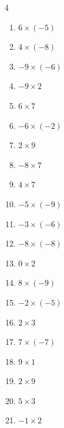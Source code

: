 \begin{multicols}{4}
\begin{enumerate}
  \item $6\times (-5)$
        \phantom{$=-30$}

  \item $4\times (-8)$
        \phantom{$=-32$}

  \item $-9\times (-6)$
        \phantom{$=54$}

  \item $-9\times 2$
        \phantom{$=-18$}

  \item $6\times 7$
        \phantom{$=42$}

  \item $-6\times (-2)$
        \phantom{$=12$}

  \item $2\times 9$
        \phantom{$=18$}

  \item $-8\times 7$
        \phantom{$=-56$}

  \item $4\times 7$
        \phantom{$=28$}

  \item $-5\times (-9)$
        \phantom{$=45$}

  \item $-3\times (-6)$
        \phantom{$=18$}

  \item $-8\times (-8)$
        \phantom{$=64$}

  \item $0\times 2$
        \phantom{$=0$}

  \item $8\times (-9)$
        \phantom{$=-72$}

  \item $-2\times (-5)$
        \phantom{$=10$}

  \item $2\times 3$
        \phantom{$=6$}

  \item $7\times (-7)$
        \phantom{$=-49$}

  \item $9\times 1$
        \phantom{$=9$}

  \item $2\times 9$
        \phantom{$=18$}

  \item $5\times 3$
        \phantom{$=15$}

  \item $-1\times 2$
        \phantom{$=-2$}


\end{enumerate}
\end{multicols}
